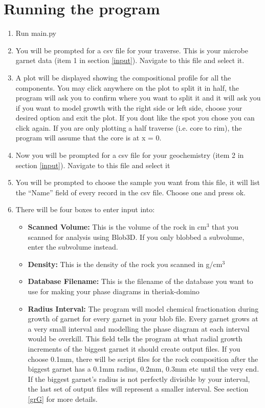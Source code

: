 \documentclass[12pt]{article}
\begin{document}
\section{Running the program} \label{run}
\begin{enumerate}
\item Run main.py
\item You will be prompted for a csv file for your traverse. This is your microbe garnet data (item 1 in section \ref{input}). Navigate to this file and select it.
\item A plot will be displayed showing the compositional profile for all the components. You may click anywhere on the plot to split it in half, the program will ask you to confirm where you want to split it and it will ask you if you want to model growth with the right side or left side, choose your desired option and exit the plot. If you dont like the spot you chose you can click again. If you are only plotting a half traverse (i.e. core to rim), the program will assume that the core is at x = 0.
\item Now you will be prompted for a csv file for your geochemistry (item 2 in section \ref{input}). Navigate to this file and select it
\item You will be prompted to choose the sample you want from this file, it will list the ``Name'' field of every record in the csv file. Choose one and press ok.
\item There will be four boxes to enter input into:
\begin{itemize}
\item \textbf{Scanned Volume:} This is the volume of the rock in cm$^3$ that you scanned for analysis using Blob3D. If you only blobbed a subvolume, enter the subvolume instead.
\item \textbf{Density:} This is the density of the rock you scanned in g/cm$^3$
\item \textbf{Database Filename:} This is the filename of the database you want to use for making your phase diagrams in theriak-domino
\item \textbf{Radius Interval:} The program will model chemical fractionation during growth of garnet for every garnet in your blob file. Every garnet grows at a very small interval and modelling the phase diagram at each interval would be overkill. This field tells the program at what radial growth increments of the biggest garnet it should create output files. If you choose 0.1mm, there will be script files for the rock composition after the biggest garnet has a 0.1mm radius, 0.2mm, 0.3mm etc until the very end. If the biggest garnet's radius is not perfectly divisible by your interval, the last set of output files will represent a smaller interval. See section \ref{grG} for more details.

\end{itemize}
\end{enumerate}
\end{document}
